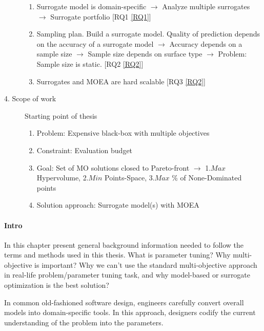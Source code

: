 \begin{blockquote}
\begin{description}
\begin{enumerate}
                    \item Surrogate model is domain-specific $\rightarrow$ Analyze multiple surrogates $\rightarrow$ Surrogate portfolio [RQ1 \ref{RQ1}]
                    \item Sampling plan. Build a surrogate model. Quality of prediction depends on the accuracy of a surrogate model  $\rightarrow$ Accuracy depends on a sample size $\rightarrow$ Sample size depends on surface type $\rightarrow$ Problem: Sample size is static. [RQ2 \ref{RQ2}]
                    \item Surrogates and MOEA are hard scalable [RQ3 \ref{RQ2}]
                \end{enumerate}
            \item[4. Scope of work] Starting point of thesis
                \begin{enumerate}
                    \item Problem: Expensive black-box with multiple objectives
                    \item Constraint: Evaluation budget
                    \item Goal: Set of MO solutions closed to Pareto-front $\rightarrow$ 1.$Max$ Hypervolume, 2.$Min$ Points-Space, 3.$Max$ \% of None-Dominated points 
                    \item Solution approach: Surrogate model(s) with MOEA
                \end{enumerate}
        \end{description}
    \end{blockquote}

    \paragraph{Intro}
    In this chapter present general background information needed to follow the terms and methods used in this thesis. What is parameter tuning? Why multi-objective is important? Why we can't use the standard multi-objective approach in real-life problem/parameter tuning task, and why model-based or surrogate optimization is the best solution?

    In common old-fashioned software design, engineers carefully convert overall models into domain-specific tools. In this approach, designers codify the current understanding of the problem into the parameters. 

